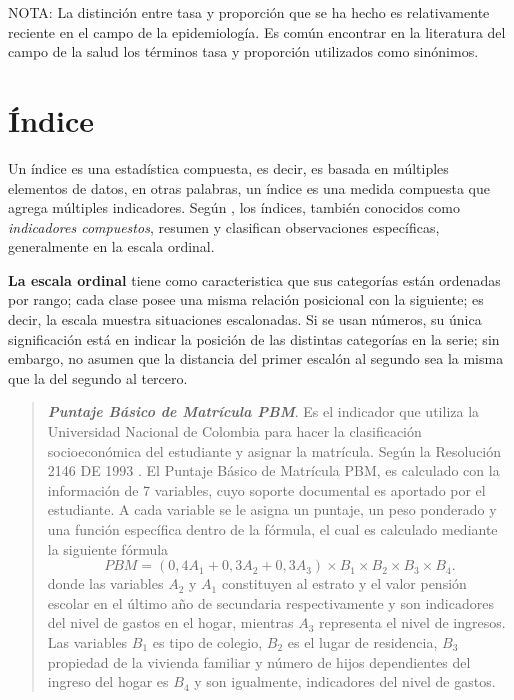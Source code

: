 \documentclass[
]{book}
\begin{document}
NOTA: La distinción entre tasa y proporción que se ha hecho es relativamente
reciente en el campo de la epidemiología. Es común encontrar en la literatura del campo de la salud los términos tasa y proporción utilizados como sinónimos.

\hypertarget{pbm}{%
\chapter{Índice}\label{pbm}}

Un índice es una estadística compuesta, es decir, es basada en múltiples elementos de datos, en otras palabras, un índice es una medida compuesta que agrega múltiples indicadores. Según \citet{ContributorstoWikimediaprojects2020Nov}, los índices, también conocidos como \emph{indicadores compuestos}, resumen y clasifican observaciones específicas, generalmente en la escala ordinal.

\textbf{La escala ordinal}
tiene como caracteristica que sus categorías están ordenadas por rango; cada clase posee una misma relación posicional con la siguiente; es decir, la escala muestra situaciones escalonadas. Si se usan números, su única significación está en indicar la posición de las distintas categorías en la serie; sin embargo, no asumen que la distancia del primer escalón al segundo sea la misma que la del segundo al tercero.

\begin{quote}
\textbf{\emph{Puntaje Básico de Matrícula PBM}}.
Es el indicador que utiliza la Universidad Nacional de Colombia para hacer la
clasificación socioeconómica del estudiante y asignar la matrícula. Según la Resolución 2146 DE 1993 \citep{BibEntry2021Maria}. El Puntaje Básico de Matrícula PBM, es calculado con la información de 7 variables, cuyo
soporte documental es aportado por el estudiante. A cada variable se le asigna un puntaje, un peso ponderado y una función específica dentro de la fórmula, el cual es calculado mediante la siguiente fórmula
\[\begin{equation}
PBM=(0,4A_1+0,3A_2+0,3A_3)\times B_1 \times B_2 \times B_3 \times B_4.
\end{equation}\]
donde las variables \(A_2\) y \(A_1\) constituyen al estrato y el valor pensión escolar en el último año de secundaria respectivamente y son indicadores del nivel de gastos en el hogar, mientras \(A_3\) representa el nivel de ingresos. Las variables \(B_1\) es tipo de colegio, \(B_2\) es el lugar de residencia, \(B_3\) propiedad de la vivienda familiar y número de hijos dependientes del ingreso del hogar es \(B_4\) y son igualmente, indicadores del nivel de gastos.
\end{quote}
\end{document}
